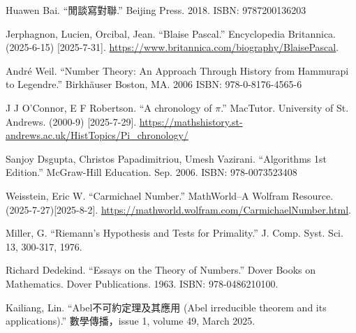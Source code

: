 Huawen Bai. ``閒談寫對聯.'' Beijing Press. 2018. ISBN: 9787200136203

Jerphagnon, Lucien, Orcibal, Jean. ``Blaise Pascal.'' Encyclopedia Britannica. (2025-6-15) [2025-7-31]. \url{https://www.britannica.com/biography/BlaisePascal}.


André Weil. ``Number Theory: An Approach Through History from Hammurapi to Legendre.'' Birkhäuser Boston, MA. 2006 ISBN: 978-0-8176-4565-6

J J O'Connor, E F Robertson. ``A chronology of $\pi$.'' MacTutor. University of St. Andrews. (2000-9) [2025-7-29]. \url{https://mathshistory.st-andrews.ac.uk/HistTopics/Pi_chronology/}


Sanjoy Dsgupta, Christos Papadimitriou, Umesh Vazirani. ``Algorithms 1st Edition.'' McGraw-Hill Education. Sep. 2006. ISBN: 978-0073523408

Weisstein, Eric W. ``Carmichael Number.'' MathWorld--A Wolfram Resource. (2025-7-27)[2025-8-2]. \url{https://mathworld.wolfram.com/CarmichaelNumber.html}.

Miller, G. ``Riemann's Hypothesis and Tests for Primality.'' J. Comp. Syst. Sci. 13, 300-317, 1976.

Richard Dedekind. ``Essays on the Theory of Numbers.'' Dover Books on Mathematics. Dover Publications. 1963. ISBN: 978-0486210100.

Kailiang, Lin. ``Abel不可約定理及其應用 (Abel irreducible theorem and its applications).'' 數學傳播，issue 1, volume 49, March 2025.
